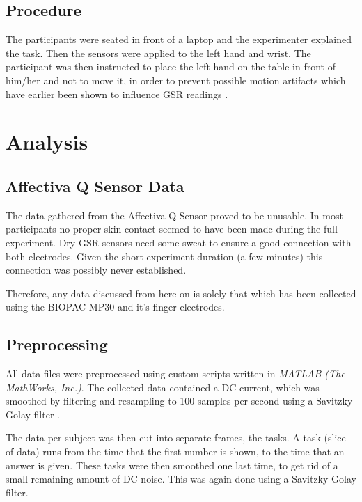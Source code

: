 \documentclass[11pt,leqno,a4paper]{report} %
\begin{document}
\subsection{Procedure}
The participants were seated in front of a laptop and the experimenter explained the task. Then the sensors were applied to the left hand and wrist. The participant was then instructed to place the left hand on the table in front of him/her and not to move it, in order to prevent possible motion artifacts which have earlier been shown to influence GSR readings \citep{motionart}.

\pagebreak

\section{Analysis}

\subsection{Affectiva Q Sensor Data}
The data gathered from the Affectiva Q Sensor proved to be unusable. In most participants no proper skin contact seemed to have been made during the full experiment. Dry GSR sensors need some sweat to ensure a good connection with both electrodes. Given the short experiment duration (a few minutes) this connection was possibly never established.


Therefore, any data discussed from here on is solely that which has been collected using the BIOPAC MP30 and it's finger electrodes.


\subsection{Preprocessing}
All data files were preprocessed using custom scripts written in \emph{MATLAB (The MathWorks, Inc.)}. The collected data contained a DC current, which was smoothed by filtering and resampling to 100 samples per second using a Savitzky-Golay filter \citep{savitzky1964smoothing}. 

The data per subject was then cut into separate frames, the tasks. A task (slice of data) runs from the time that the first number is shown, to the time that an answer is given. These tasks were then smoothed one last time, to get rid of a small remaining amount of DC noise. This was again done using a Savitzky-Golay filter.
\end{document}
